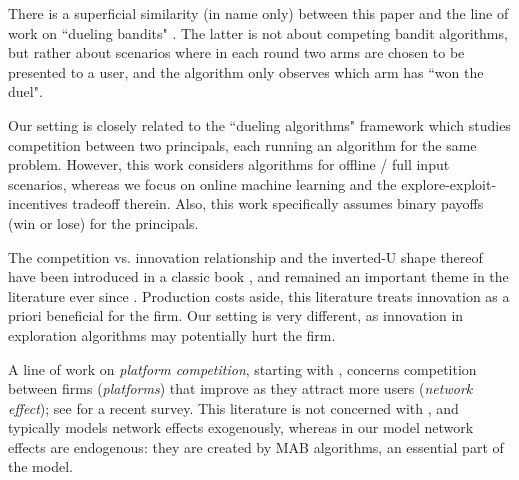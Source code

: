There is a superficial similarity (in name only) between this paper and the line of work on ``dueling bandits"
    \citep[\eg][]{Yue-dueling12,Yue-dueling-icml09}.
The latter is not about competing bandit algorithms, but rather about scenarios where in each round two arms are chosen to be presented to a user, and the algorithm only observes which arm has ``won the duel".

Our setting is closely related to the ``dueling algorithms" framework \citep{DuelingAlgs-stoc11} which studies competition between two principals, each running an algorithm for the same problem. However, this work considers algorithms for offline / full input scenarios, whereas we focus on online machine learning and the explore-exploit-incentives tradeoff therein. Also, this work specifically assumes binary payoffs (\ie win or lose) for the principals. 

 The competition vs. innovation relationship and the inverted-U shape thereof have been introduced in a classic book \citep{Schumpeter-42}, and remained an important theme in the literature ever since \cite[\eg][]{Aghion-QJE05,Vives-08}. Production costs aside, this literature treats innovation as a priori beneficial for the firm. Our setting is very different, as innovation in exploration algorithms may potentially hurt the firm.


A line of work on \emph{platform competition}, starting with \cite{Rysman09}, concerns competition between firms (\emph{platforms}) that improve as they attract more users (\emph{network effect}); see \citet{Weyl-White-14} for a recent survey. This literature is not concerned with \innovation, and typically models network effects exogenously, whereas in our model network effects are endogenous: they are created by MAB algorithms, an essential part of the model.


